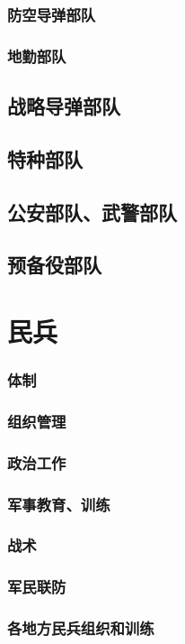 \documentclass[UTF8]{../ApplicationUniverse}
\begin{document}
        \subsubsection{防空导弹部队}
        \subsubsection{地勤部队}
    \subsection{战略导弹部队}
    \subsection{特种部队}
    \subsection{公安部队、武警部队}
    \subsection{预备役部队}

\section{民兵}
    \subsubsection{体制}
    \subsubsection{组织管理}
    \subsubsection{政治工作}
    \subsubsection{军事教育、训练}
    \subsubsection{战术}
    \subsubsection{军民联防}
    \subsubsection{各地方民兵组织和训练}
\end{document}
